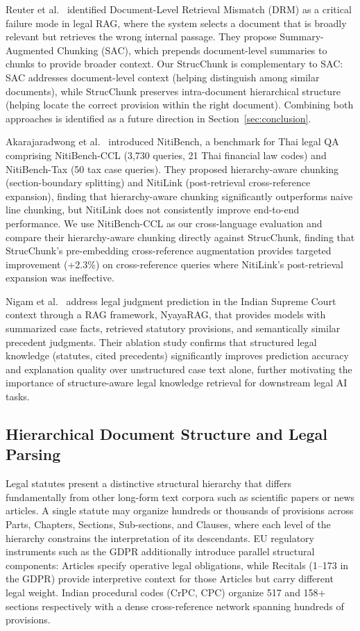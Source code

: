 \documentclass[sn-mathphys,Numbered]{sn-jnl}%
\begin{document}
Reuter et al.~\cite{reuter-etal-2025-towards} identified Document-Level Retrieval Mismatch
(DRM) as a critical failure mode in legal RAG, where the system selects
a document that is broadly relevant but retrieves the wrong internal
passage.  They propose Summary-Augmented Chunking (SAC), which prepends
document-level summaries to chunks to provide broader context.  Our
StrucChunk is complementary to SAC: SAC addresses document-level
context (helping distinguish among similar documents), while StrucChunk
preserves intra-document hierarchical structure (helping locate the
correct provision within the right document).  Combining both approaches
is identified as a future direction in Section~\ref{sec:conclusion}.

Akarajaradwong et al.~\cite{akarajaradwong2025nitibenchcomprehensivestudyllm} introduced NitiBench, a benchmark
for Thai legal QA comprising NitiBench-CCL (3,730 queries, 21 Thai
financial law codes) and NitiBench-Tax (50 tax case queries).  They
proposed hierarchy-aware chunking (section-boundary splitting) and
NitiLink (post-retrieval cross-reference expansion), finding that
hierarchy-aware chunking significantly outperforms naive line chunking,
but NitiLink does not consistently improve end-to-end performance.  We
use NitiBench-CCL as our cross-language evaluation and compare
their hierarchy-aware chunking directly against StrucChunk, finding that
StrucChunk's pre-embedding cross-reference augmentation provides targeted
improvement (+2.3\%) on cross-reference queries where NitiLink's
post-retrieval expansion was ineffective.

Nigam et al.~\cite{nigam-etal-2025-nyayarag} address legal judgment prediction in the Indian
Supreme Court context through a RAG framework, NyayaRAG, that provides
models with summarized case facts, retrieved statutory provisions, and
semantically similar precedent judgments.  Their ablation study confirms
that structured legal knowledge (statutes, cited precedents) significantly
improves prediction accuracy and explanation quality over unstructured
case text alone, further motivating the importance of structure-aware
legal knowledge retrieval for downstream legal AI tasks.

\subsection{Hierarchical Document Structure and Legal Parsing}
\label{sec:related_structure}

Legal statutes present a distinctive structural hierarchy that differs
fundamentally from other long-form text corpora such as scientific papers
or news articles.  A single statute may organize hundreds or thousands of
provisions across Parts, Chapters, Sections, Sub-sections, and Clauses,
where each level of the hierarchy constrains the interpretation of its
descendants.  EU regulatory instruments such as the GDPR additionally
introduce parallel structural components: Articles specify operative legal
obligations, while Recitals (1--173 in the GDPR) provide interpretive
context for those Articles but carry different legal weight.  Indian
procedural codes (CrPC, CPC) organize 517 and 158+ sections respectively
with a dense cross-reference network spanning hundreds of provisions.
\end{document}
